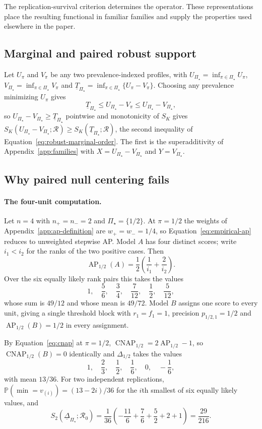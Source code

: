 \documentclass[11pt]{article}
\newcommand{\AP}{\operatorname{AP}}
\newcommand{\CNAP}{\operatorname{CNAP}}
\newcommand{\Regime}{\mathcal{R}}
\newcommand{\PSet}{\Pi_\star}
\newcommand{\Prb}{\mathbb{P}}
\newcommand{\RobDelta}{\underline{\Delta}_{\PSet}}
\theoremstyle{remark}
\begin{document}
The replication-survival criterion determines the operator. These representations place the resulting functional in familiar families and supply the properties used elsewhere in the paper.

\subsection{Marginal and paired robust support}

Let $U_\pi$ and $V_\pi$ be any two prevalence-indexed profiles, with $U_{\PSet}=\inf_{\pi\in\PSet}U_\pi$, $V_{\PSet}=\inf_{\pi\in\PSet}V_\pi$ and $\underline{T}_{\PSet}=\inf_{\pi\in\PSet}\{U_\pi-V_\pi\}$. Choosing any prevalence minimizing $U_\pi$ gives
\[
\underline{T}_{\PSet}
\leq
U_{\PSet}-V_\pi
\leq
U_{\PSet}-V_{\PSet},
\]
so $U_{\PSet}-V_{\PSet}\geq\underline{T}_{\PSet}$ pointwise and monotonicity of $S_K$ gives $S_K(U_{\PSet}-V_{\PSet};\Regime)\geq S_K(\underline{T}_{\PSet};\Regime)$, the second inequality of Equation~\eqref{eq:robust-marginal-order}. The first is the superadditivity of Appendix~\ref{app:families} with $X=U_{\PSet}-V_{\PSet}$ and $Y=V_{\PSet}$.

\subsection{Why paired null centering fails}
\label{app:paired-null}

\paragraph{The four-unit computation.}
Let $n=4$ with $n_+=n_-=2$ and $\PSet=\{1/2\}$. At $\pi=1/2$ the weights of Appendix~\ref{app:ap-definition} are $w_+=w_-=1/4$, so Equation~\eqref{eq:empirical-ap} reduces to unweighted stepwise AP. Model $A$ has four distinct scores; write $i_1<i_2$ for the ranks of the two positive cases. Then
\[
\AP_{1/2}(A)
=
\frac12
\left(
\frac{1}{i_1}+\frac{2}{i_2}
\right).
\]
Over the six equally likely rank pairs this takes the values
\[
1,\quad
\frac56,\quad
\frac34,\quad
\frac{7}{12},\quad
\frac12,\quad
\frac{5}{12},
\]
whose sum is $49/12$ and whose mean is $49/72$. Model $B$ assigns one score to every unit, giving a single threshold block with $r_1=f_1=1$, precision $p_{1/2,1}=1/2$ and $\AP_{1/2}(B)=1/2$ in every assignment.

By Equation~\eqref{eq:cnap} at $\pi=1/2$, $\CNAP_{1/2}=2\AP_{1/2}-1$, so $\CNAP_{1/2}(B)=0$ identically and $\Delta_{1/2}$ takes the values
\[
1,\quad
\frac23,\quad
\frac12,\quad
\frac16,\quad
0,\quad
-\frac16 ,
\]
with mean $13/36$. For two independent replications, $\Prb(\min=v_{(i)})=(13-2i)/36$ for the $i$th smallest of six equally likely values, and
\[
S_2(\RobDelta;\Regime_0)
=
\frac{1}{36}
\left(
-\frac{11}{6}
+\frac{7}{6}
+\frac52
+2
+1
\right)
=
\frac{29}{216}.
\]
\end{document}

